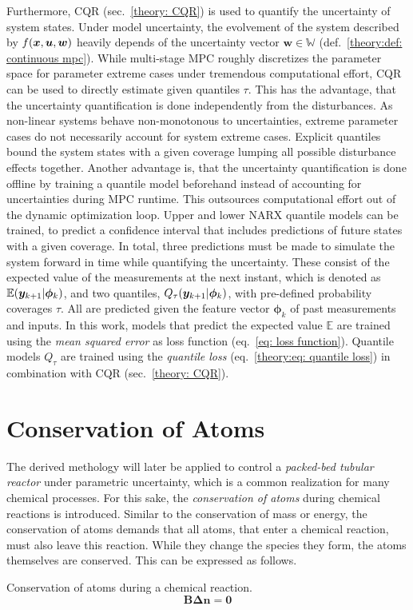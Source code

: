 Furthermore, CQR (sec.~\ref{theory: CQR}) is used to quantify the uncertainty of system states. 
Under model uncertainty, the evolvement of the system described by $f({\bm{x}}, {\bm{u}}, {\bm{w}})$ heavily
depends of the uncertainty vector $\bm{w} \in \mathbb{W}$ (def.~\ref{theory:def: continuous mpc}).
While multi-stage MPC roughly discretizes the parameter space for parameter extreme cases under tremendous computational effort,
CQR can be used to directly estimate given quantiles $\tau$.
This has the advantage, that the uncertainty quantification is done independently from the disturbances. As non-linear
systems behave non-monotonous to uncertainties, extreme parameter cases do not necessarily account for
system extreme cases. Explicit quantiles bound the system states with a given coverage lumping all
possible disturbance effects together.
Another advantage is, that the uncertainty quantification is done offline by training a quantile model beforehand instead
of accounting for uncertainties during MPC runtime. This outsources computational effort out of the dynamic optimization loop.
\newline
\newline
Upper and lower
NARX quantile models can be trained, to predict a confidence interval that includes predictions of future states
with a given coverage. In total, three predictions must be made to simulate the system forward in time
while quantifying the uncertainty. These consist of the expected value of the measurements at the next instant,
which is denoted as $\mathbb{E}({\bm{y}}_{k+1}|\bm{\phi}_k)$, and two quantiles, $Q_\tau({\bm{y}}_{k+1}|\bm{\phi}_k)$,
with pre-defined probability coverages $\tau$. All are predicted given the feature vector $\bm{\phi}_k$
of past measurements and inputs. In this work, models that predict the expected value $\mathbb{E}$ are trained 
using the \emph{mean squared error} as loss function (eq.~\ref{eq: loss function}). 
Quantile models $Q_\tau$ are trained using the \emph{quantile loss} (eq.~\ref{theory:eq: quantile loss})
in combination with CQR (sec.~\ref{theory: CQR}).


\section{Conservation of Atoms}

The derived methology will later be applied to control a \emph{packed-bed tubular reactor} under parametric uncertainty, which is
a common realization for many chemical processes. For this sake, the \emph{conservation of atoms} during chemical reactions
is introduced. Similar to the conservation of mass or energy, the conservation of atoms demands that all atoms, that enter
a chemical reaction, must also leave this reaction. While they change the species they form, the atoms themselves are conserved.
This can be expressed as follows.
\begin{theorem} Conservation of atoms during a chemical reaction.
    \label{theory:th: conservation of atoms}
    \[
    \bm{B} \bm{\Delta n} = \bm{0}
    \]
\end{theorem}

